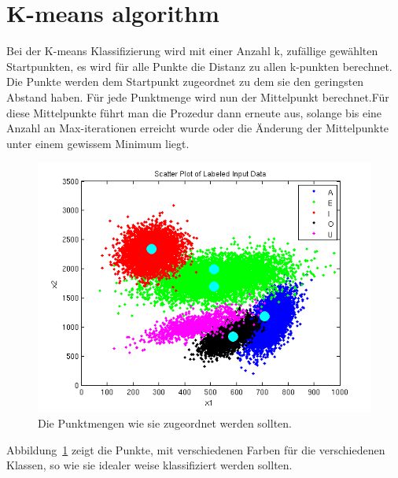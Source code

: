 \section{K-means algorithm}

Bei der K-means Klassifizierung wird  mit einer Anzahl k, zufällige gewählten Startpunkten, es wird für alle Punkte die Distanz  zu allen k-punkten berechnet. Die Punkte werden dem Startpunkt zugeordnet zu dem sie den geringsten Abstand haben. Für jede Punktmenge wird nun der Mittelpunkt berechnet.Für diese Mittelpunkte führt man die Prozedur dann erneute aus, solange bis eine Anzahl an Max-iterationen erreicht wurde oder die Änderung der Mittelpunkte unter einem gewissem Minimum liegt. 


\begin{figure}[h!]
  \begin{center}
    \includegraphics[width=1.0\textwidth]{./figures/6_2_labeled}
    \caption{Die Punktmengen wie sie zugeordnet werden sollten.}
    \label{fig:6_2_labeled}
  \end{center}
\end{figure}

Abbildung~\ref{fig:6_2_labeled} zeigt die Punkte, mit verschiedenen Farben für die verschiedenen Klassen, so wie sie idealer weise klassifiziert werden sollten.


